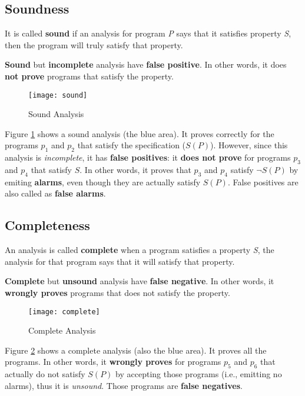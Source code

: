 \subsection{Soundness}


It is called \textbf{sound} if an analysis for program \textsl{P} says
that it satisfies property \textsl{S}, then the program will truly
satisfy that property.

\textbf{Sound} but \textbf{incomplete} analysis have \textbf{false
  positive}. In other words, it does \textbf{not prove} programs that
satisfy the property.

\begin{figure}[h]
  \texttt{[image: sound]}
  \caption{Sound Analysis}
  \label{fig:sound}
\end{figure}

Figure \ref{fig:sound} shows a sound analysis (the blue area). It
proves correctly for the programs $ p_1 $ and $ p_2 $ that satisfy the
specification ($S(P)$). However, since this analysis is
\textit{incomplete}, it has \textbf{false positives}: it \textbf{does
  not prove} for programs $ p_3 $ and $ p_4 $ that satisfy $S$. In
other words, it proves that $ p_3 $ and $ p_4 $ satisfy $ \neg S(P) $
by emiting \textbf{alarms}, even though they are actually satisfy
$ S(P) $. False positives are also called as \textbf{false alarms}.

\subsection{Completeness}

An analysis is called \textbf{complete} when a program satisfies a
property \textsl{S}, the analysis for that program says that it will
satisfy that property.


\textbf{Complete} but \textbf{unsound} analysis have \textbf{false
  negative}. In other words, it \textbf{wrongly proves} programs that
does not satisfy the property.


\begin{figure}[h]
  \texttt{[image: complete]}
  \caption{Complete Analysis}
  \label{fig:complete}
\end{figure}

Figure \ref{fig:complete} shows a complete analysis (also the blue
area). It proves all the programs. In other words, it \textbf{wrongly
  proves} for programs $ p_5 $ and $ p_6 $ that actually do not
satisfy $ S(P) $ by accepting those programs (i.e., emitting no
alarms), thus it is \textit{unsound}. Those programs are \textbf{false
  negatives}.


